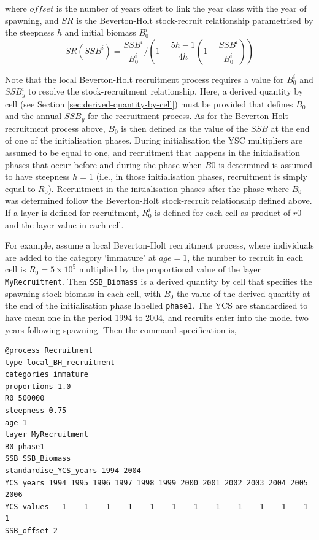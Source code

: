 where $offset$ is the number of years offset to link the year class with the year of spawning, and $SR$ is the Beverton-Holt stock-recruit relationship parametrised by the steepness $h$ and initial biomass $B_0^i$
\begin{equation}
SR(SSB^i) = \frac{SSB^i}{B_0^i} / \left( 1-\frac{5h-1}{4h} \left( 1-\frac{SSB^i}{B_0^i} \right) \right)
\end{equation}

Note that the local Beverton-Holt recruitment process requires a value for $B_0^i$ and $SSB_y^i$ to resolve the stock-recruitment relationship. Here, a derived quantity by cell (see Section \ref{sec:derived-quantity-by-cell}) must be provided that defines $B_0$ and the annual $SSB_y$ for the recruitment process. As for the Beverton-Holt recruitment process above, $B_0$ is then defined as the value of the $SSB$ at the end of one of the initialisation phases. During initialisation the YSC multipliers are assumed to be equal to one, and recruitment that happens in the initialisation phases that occur before and during the phase when $B0$ is determined is assumed to have steepness $h=1$ (i.e., in those initialisation phases, recruitment is simply equal to $R_0$). Recruitment in the initialisation phases after the phase where $B_0$ was determined follow the Beverton-Holt stock-recruit relationship defined above. If a layer is defined for recruitment, $R_0^i$ is defined for each cell as product of $r0$ and the layer value in each cell. 

For example, assume a local Beverton-Holt recruitment process, where individuals are added to the category `immature' at $age=1$, the number to recruit in each cell is $R_0=5 \times 10^5$ multiplied by the proportional value of the layer \texttt{MyRecruitment}. Then \texttt{SSB\_Biomass} is a derived quantity by cell that specifies the spawning stock biomass in each cell, with $B_0$ the value of the derived quantity at the end of the initialisation phase labelled \texttt{phase1}. The YCS are standardised to have mean one in the period 1994 to 2004, and recruits enter into the model two years following spawning. Then the command specification is,

{\small{\begin{verbatim}
@process Recruitment
type local_BH_recruitment
categories immature
proportions 1.0
R0 500000
steepness 0.75
age 1
layer MyRecruitment
B0 phase1
SSB SSB_Biomass
standardise_YCS_years 1994-2004
YCS_years 1994 1995 1996 1997 1998 1999 2000 2001 2002 2003 2004 2005 2006
YCS_values   1    1    1    1    1    1    1    1    1    1    1    1    1
SSB_offset 2
\end{verbatim}}}

